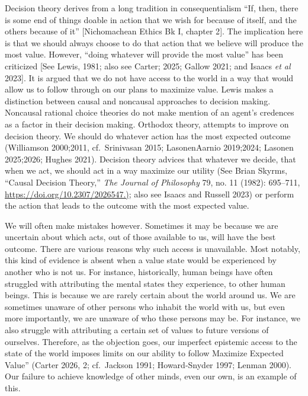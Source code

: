 \documentclass[
  letterpaper,
  DIV=11,
  numbers=noendperiod]{scrartcl}
\begin{document}
Decision theory derives from a long tradition in consequentialism ``If,
then, there is some end of things doable in action that we wish for
because of itself, and the others because of it'' {[}Nichomachean Ethics
Bk I, chapter 2{]}. The implication here is that we should always choose
to do that action that we believe will produce the most value. However,
``doing whatever will provide the most value'' has been criticized
{[}See Lewis, 1981; also see Carter; 2025; Gallow 2021; and Isaacs
\emph{et al} 2023{]}. It is argued that we do not have access to the
world in a way that would allow us to follow through on our plans to
maximize value. Lewis makes a distinction between causal and noncausal
approaches to decision making. Noncausal rational choice theories do not
make mention of an agent's credences as a factor in their decision
making. Orthodox theory, attempts to improve on decision theory. We
should do whatever action has the most expected outcome (Williamson
2000;2011, cf.~Srinivasan 2015; LasonenAarnio 2019;2024; Lasonen
2025;2026; Hughes 2021). Decision theory advices that whatever we
decide, that when we act, we should act in a way maximize our utility
(See Brian Skyrms, ``Causal Decision Theory,'' \emph{The Journal of
Philosophy} 79, no. 11 (1982): 695--711,
\href{https://doi.org/10.2307/2026547.}{https://doi.org/10.2307/2026547.)};
also see Isaacs and Russell 2023) or perform the action that leads to
the outcome with the most expected value.

We will often make mistakes however. Sometimes it may be because we are
uncertain about which acts, out of those available to us, will have the
best outcome. There are various reasons why such access is unavailable.
Most notably, this kind of evidence is absent when a value state would
be experienced by another who is not us. For instance, historically,
human beings have often struggled with attributing the mental states
they experience, to other human beings. This is because we are rarely
certain about the world around us. We are sometimes unaware of other
persons who inhabit the world with us, but even more importantly, we are
unaware of who these persons may be. For instance, we also struggle with
attributing a certain set of values to future versions of ourselves.
Therefore, as the objection goes, our imperfect epistemic access to the
state of the world imposes limits on our ability to follow Maximize
Expected Value'' (Carter 2026, 2; cf.~Jackson 1991; Howard-Snyder 1997;
Lenman 2000). Our failure to achieve knowledge of other minds, even our
own, is an example of this.
\end{document}
